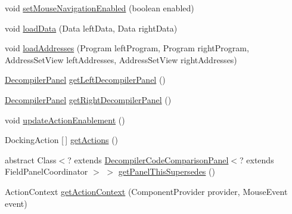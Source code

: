 \begin{DoxyCompactItemize}
\item 
void \mbox{\hyperlink{classghidra_1_1app_1_1decompiler_1_1component_1_1_decompiler_code_comparison_panel_a815816123a108a44c0ca100a475fbddc}{set\+Mouse\+Navigation\+Enabled}} (boolean enabled)
\item 
void \mbox{\hyperlink{classghidra_1_1app_1_1decompiler_1_1component_1_1_decompiler_code_comparison_panel_adb4f6d5976701b2eff6361e137ecb1b0}{load\+Data}} (Data left\+Data, Data right\+Data)
\item 
void \mbox{\hyperlink{classghidra_1_1app_1_1decompiler_1_1component_1_1_decompiler_code_comparison_panel_a12ecc6cfc75c07e6e40aa23c339986a0}{load\+Addresses}} (Program left\+Program, Program right\+Program, Address\+Set\+View left\+Addresses, Address\+Set\+View right\+Addresses)
\item 
\mbox{\hyperlink{classghidra_1_1app_1_1decompiler_1_1component_1_1_decompiler_panel}{Decompiler\+Panel}} \mbox{\hyperlink{classghidra_1_1app_1_1decompiler_1_1component_1_1_decompiler_code_comparison_panel_ade7f44621303975a5e9ad8b74dee4a2e}{get\+Left\+Decompiler\+Panel}} ()
\item 
\mbox{\hyperlink{classghidra_1_1app_1_1decompiler_1_1component_1_1_decompiler_panel}{Decompiler\+Panel}} \mbox{\hyperlink{classghidra_1_1app_1_1decompiler_1_1component_1_1_decompiler_code_comparison_panel_afd2848ffb64b02ea479f331871fca416}{get\+Right\+Decompiler\+Panel}} ()
\item 
void \mbox{\hyperlink{classghidra_1_1app_1_1decompiler_1_1component_1_1_decompiler_code_comparison_panel_a44ed95456890b14be5453662e784f7ca}{update\+Action\+Enablement}} ()
\item 
Docking\+Action \mbox{[}$\,$\mbox{]} \mbox{\hyperlink{classghidra_1_1app_1_1decompiler_1_1component_1_1_decompiler_code_comparison_panel_a059de6f337d98bd8c891033186ff7229}{get\+Actions}} ()
\item 
abstract Class$<$? extends \mbox{\hyperlink{classghidra_1_1app_1_1decompiler_1_1component_1_1_decompiler_code_comparison_panel}{Decompiler\+Code\+Comparison\+Panel}}$<$? extends Field\+Panel\+Coordinator $>$ $>$ \mbox{\hyperlink{classghidra_1_1app_1_1decompiler_1_1component_1_1_decompiler_code_comparison_panel_a1554f1f99dea8c841b875f0c6a2cb64b}{get\+Panel\+This\+Supersedes}} ()
\item 
Action\+Context \mbox{\hyperlink{classghidra_1_1app_1_1decompiler_1_1component_1_1_decompiler_code_comparison_panel_a1be4c60966ad4e1fc8c69a6aa06db822}{get\+Action\+Context}} (Component\+Provider provider, Mouse\+Event event)

\end{DoxyCompactItemize}
